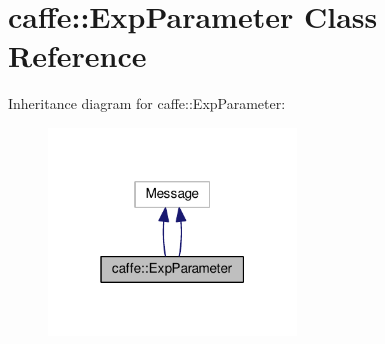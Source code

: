 \hypertarget{classcaffe_1_1_exp_parameter}{}\section{caffe\+:\+:Exp\+Parameter Class Reference}
\label{classcaffe_1_1_exp_parameter}


Inheritance diagram for caffe\+:\+:Exp\+Parameter\+:
\nopagebreak
\begin{figure}[H]
\begin{center}
\leavevmode
\includegraphics[width=187pt]{classcaffe_1_1_exp_parameter__inherit__graph}
\end{center}
\end{figure}
